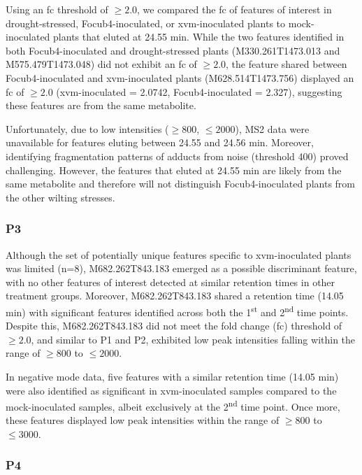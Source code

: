 Using an \ac{fc} threshold of $\ge2.0$, we compared the \ac{fc} of features of interest in drought-stressed, \ac{Focub4}-inoculated, or \ac{xvm}-inoculated plants to mock-inoculated plants that eluted at 24.55 min. While the two features identified in both \ac{Focub4}-inoculated and drought-stressed plants (M330.261T1473.013 and M575.479T1473.048) did not exhibit an \ac{fc} of $\geq2.0$, the feature shared between \ac{Focub4}-inoculated and \ac{xvm}-inoculated plants (M628.514T1473.756) displayed an \ac{fc} of $\geq2.0$ (\ac{xvm}-inoculated = 2.0742, \ac{Focub4}-inoculated = 2.327), suggesting these features are from the same metabolite. 
 
Unfortunately, due to low intensities ($\geq800$, $\leq2000$), MS2 data were unavailable for features eluting between 24.55 and 24.56 min. Moreover, identifying fragmentation patterns of adducts from noise (threshold 400) proved challenging. However, the features that eluted at 24.55 min are likely from the same metabolite and therefore will not distinguish \ac{Focub4}-inoculated plants from the other wilting stresses.

\subsubsection{P3}

Although the set of potentially unique features specific to \ac{xvm}-inoculated plants was limited (n=8), M682.262T843.183 emerged as a possible discriminant feature, with no other features of interest detected at similar retention times in other treatment groups. Moreover, M682.262T843.183 shared a retention time (14.05 min) with significant features identified across both the 1\textsuperscript{st} and 2\textsuperscript{nd} time points. Despite this, M682.262T843.183 did not meet the fold change (\ac{fc}) threshold of $\geq2.0$, and similar to P1 and P2, exhibited low peak intensities falling within the range of $\geq800$ to $\leq2000$.

In negative mode data, five features with a similar retention time (14.05 min) were also identified as significant in \ac{xvm}-inoculated samples compared to the mock-inoculated samples, albeit exclusively at the 2\textsuperscript{nd} time point. Once more, these features displayed low peak intensities within the range of $\geq800$ to $\leq3000$.

\subsubsection{P4}

